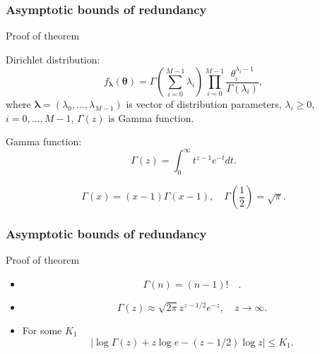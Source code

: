 \documentclass[14pt]{beamer}
\renewcommand{\vec}[1]{\ensuremath{\boldsymbol{#1}}}
\begin{document}
\begin{frame}
\frametitle{Asymptotic bounds of redundancy}
Proof of theorem
\begin{itemize}    
\small{
    
    \item Dirichlet distribution:
    \begin{equation}
    \label{FDirichlet}
    f_{\vec \lambda}(\vec \theta) = \Gamma \left
    (\sum_{i=0}^{M-1} \lambda_i \right) \prod _{i=0}^{M-1} \frac
    {\theta_i^{\lambda_i -1}}{\Gamma(\lambda_i)},
    \end{equation}
    where $\vec \lambda=(\lambda_0,...,\lambda_{M-1})$ is vector of distribution parameters, $\lambda_i \ge 0$, $i=0,...,M-1$, $\Gamma(z)$ is Gamma function.
    
    \item Gamma function:
    \[
    \Gamma(z)=\int_0^\infty t^{z-1}e^{-t}dt.
    \]
    
    \item 
    \[
    \Gamma(x)=(x-1)\Gamma(x-1), \quad
    \Gamma\left(\frac{1}{2}\right)=\sqrt{\pi}.
    \]
}
\end{itemize}
\end{frame}


\begin{frame}
\frametitle{Asymptotic bounds of redundancy}
Proof of theorem
\begin{itemize}    

    \item 
    \[
    \Gamma(n)=(n-1)! \quad .
    \]
    
    \item 
    \[
    \Gamma(z) \approx \sqrt{2\pi}z^{z-1/2}e^{-z}, \quad z \rightarrow \infty.
    \]
    
    \item For some $K_1$
    \begin{equation}
    \label{Gam_Stirl} \left | \log \Gamma(z) + z\log e - (z-1/2)\log z
    \right | \le K_1 .
    \end{equation}

\end{itemize}
\end{frame}
\end{document}
